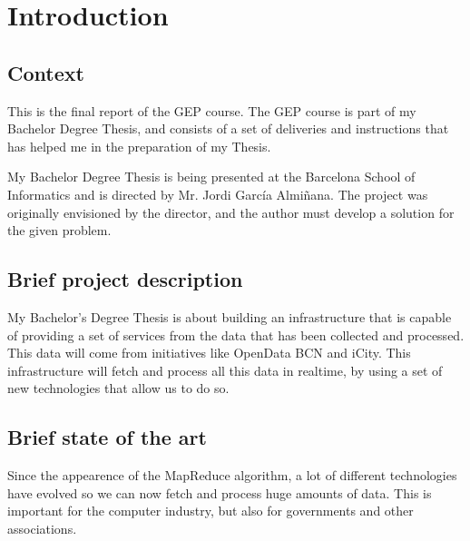 %
%
%

\section{Introduction}

\subsection{Context}

This is the final report of the GEP course. The GEP course is part of my
Bachelor Degree Thesis, and consists of a set of deliveries and instructions
that has helped me in the preparation of my Thesis.

My Bachelor Degree Thesis is being presented at the Barcelona School of
Informatics and is directed by Mr. Jordi García Almiñana. The project was
originally envisioned by the director, and the author must develop a solution
for the given problem.

\subsection{Brief project description}

My Bachelor's Degree Thesis is about building an infrastructure that is
capable of providing a set of services from the data that has been collected
and processed. This data will come from initiatives like OpenData BCN and
iCity. This infrastructure will fetch and process all this data in realtime,
by using a set of new technologies that allow us to do so.

\subsection{Brief state of the art}

Since the appearence of the MapReduce algorithm, a lot of different
technologies have evolved so we can now fetch and process huge amounts of data.
This is important for the computer industry, but also for governments and other
associations.

